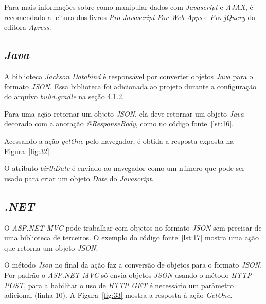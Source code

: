 Para mais informações sobre como manipular dados com \textit{Javascript} e \textit{AJAX}, é recomendada a leitura dos livros \textit{Pro Javascript For Web Apps} \cite{20} e \textit{Pro jQuery} \cite{21} da editora \textit{Apress}.

\subsection{\textit{Java}}

A biblioteca \textit{Jackson Databind} é responsável por converter objetos \textit{Java} para o formato \textit{JSON}. Essa biblioteca foi adicionada ao projeto durante a configuração do arquivo \textit{build.gradle} na seção 4.1.2. 

Para uma ação retornar um objeto \textit{JSON}, ela deve retornar um objeto \textit{Java} decorado com a anotação \textit{@ResponseBody}, como no código fonte~\ref{lst:16}.


Acessando a ação \textit{getOne} pelo navegador, é obtida a resposta exposta na Figura~\ref{fig:32}.


O atributo \textit{birthDate} é enviado ao navegador como um número que pode ser usado para criar um objeto \textit{Date} do \textit{Javascript}.

\subsection{\textit{.NET}}

O \textit{ASP.NET MVC} pode trabalhar com objetos no formato \textit{JSON} sem precisar de uma biblioteca de terceiros. O exemplo do código fonte~\ref{lst:17} mostra uma ação que retorna um objeto \textit{JSON}.


O método \textit{Json} no final da ação faz a conversão de objetos para o formato \textit{JSON}. Por padrão o \textit{ASP.NET MVC} só envia objetos \textit{JSON} usando o método \textit{HTTP POST}, para a habilitar o uso de \textit{HTTP GET} é necessário um parâmetro adicional (linha 10). A Figura~\ref{fig:33} mostra a resposta à ação \textit{GetOne}.



